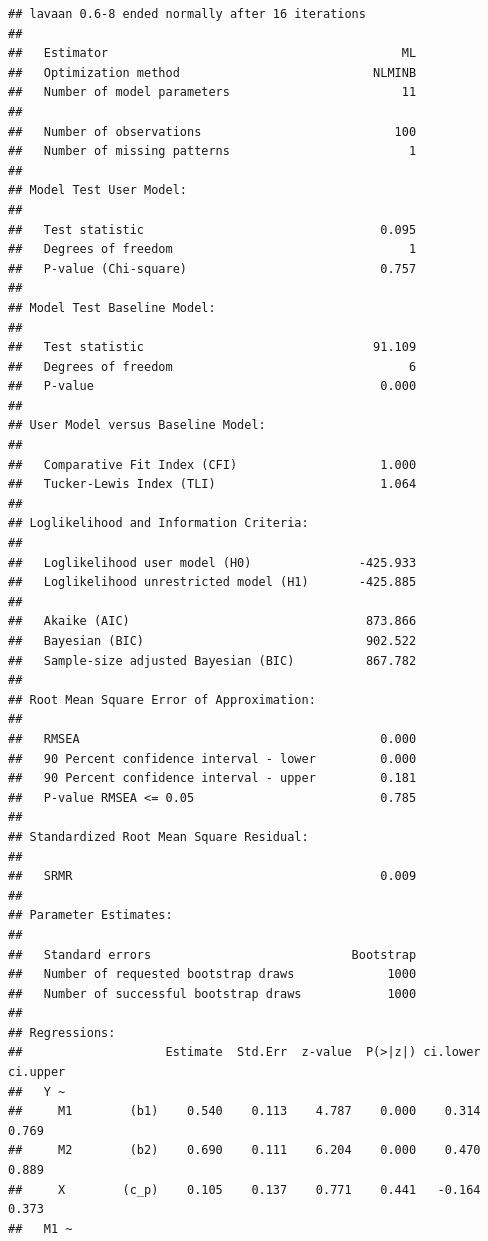 \documentclass[
  english,
]{book}
\begin{document}
\begin{verbatim}
## lavaan 0.6-8 ended normally after 16 iterations
## 
##   Estimator                                         ML
##   Optimization method                           NLMINB
##   Number of model parameters                        11
##                                                       
##   Number of observations                           100
##   Number of missing patterns                         1
##                                                       
## Model Test User Model:
##                                                       
##   Test statistic                                 0.095
##   Degrees of freedom                                 1
##   P-value (Chi-square)                           0.757
## 
## Model Test Baseline Model:
## 
##   Test statistic                                91.109
##   Degrees of freedom                                 6
##   P-value                                        0.000
## 
## User Model versus Baseline Model:
## 
##   Comparative Fit Index (CFI)                    1.000
##   Tucker-Lewis Index (TLI)                       1.064
## 
## Loglikelihood and Information Criteria:
## 
##   Loglikelihood user model (H0)               -425.933
##   Loglikelihood unrestricted model (H1)       -425.885
##                                                       
##   Akaike (AIC)                                 873.866
##   Bayesian (BIC)                               902.522
##   Sample-size adjusted Bayesian (BIC)          867.782
## 
## Root Mean Square Error of Approximation:
## 
##   RMSEA                                          0.000
##   90 Percent confidence interval - lower         0.000
##   90 Percent confidence interval - upper         0.181
##   P-value RMSEA <= 0.05                          0.785
## 
## Standardized Root Mean Square Residual:
## 
##   SRMR                                           0.009
## 
## Parameter Estimates:
## 
##   Standard errors                            Bootstrap
##   Number of requested bootstrap draws             1000
##   Number of successful bootstrap draws            1000
## 
## Regressions:
##                    Estimate  Std.Err  z-value  P(>|z|) ci.lower ci.upper
##   Y ~                                                                   
##     M1        (b1)    0.540    0.113    4.787    0.000    0.314    0.769
##     M2        (b2)    0.690    0.111    6.204    0.000    0.470    0.889
##     X        (c_p)    0.105    0.137    0.771    0.441   -0.164    0.373
##   M1 ~                                                                  

\end{verbatim}
\end{document}
